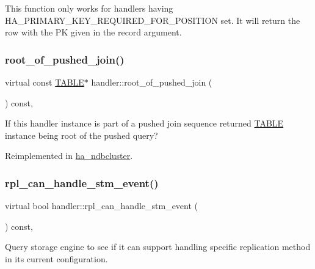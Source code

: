 This function only works for handlers having H\+A\+\_\+\+P\+R\+I\+M\+A\+R\+Y\+\_\+\+K\+E\+Y\+\_\+\+R\+E\+Q\+U\+I\+R\+E\+D\+\_\+\+F\+O\+R\+\_\+\+P\+O\+S\+I\+T\+I\+ON set. It will return the row with the PK given in the record argument. \mbox{\label{classhandler_a624f6946109f48559e92a9e7c1b86517}} 
\subsubsection{\texorpdfstring{root\+\_\+of\+\_\+pushed\+\_\+join()}{root\_of\_pushed\_join()}}
{\footnotesize\ttfamily virtual const \mbox{\hyperlink{structTABLE}{T\+A\+B\+LE}}$\ast$ handler\+::root\+\_\+of\+\_\+pushed\+\_\+join (\begin{DoxyParamCaption}{ }\end{DoxyParamCaption}) const\hspace{0.3cm}{\ttfamily [inline]}, {\ttfamily [virtual]}}

If this handler instance is part of a pushed join sequence returned \mbox{\hyperlink{structTABLE}{T\+A\+B\+LE}} instance being root of the pushed query? 

Reimplemented in \mbox{\hyperlink{classha__ndbcluster_abf2a5948eca40262f5d533d7c57ca414}{ha\+\_\+ndbcluster}}.

\mbox{\label{classhandler_af0be0637dfaf4fc4a2dc89334c350ec7}} 
\subsubsection{\texorpdfstring{rpl\+\_\+can\+\_\+handle\+\_\+stm\+\_\+event()}{rpl\_can\_handle\_stm\_event()}}
{\footnotesize\ttfamily virtual bool handler\+::rpl\+\_\+can\+\_\+handle\+\_\+stm\+\_\+event (\begin{DoxyParamCaption}{ }\end{DoxyParamCaption}) const\hspace{0.3cm}{\ttfamily [inline]}, {\ttfamily [virtual]}}

Query storage engine to see if it can support handling specific replication method in its current configuration. \mbox{\label{classhandler_a5f01ea7ce530c3a234e5d17363204f13}} 
